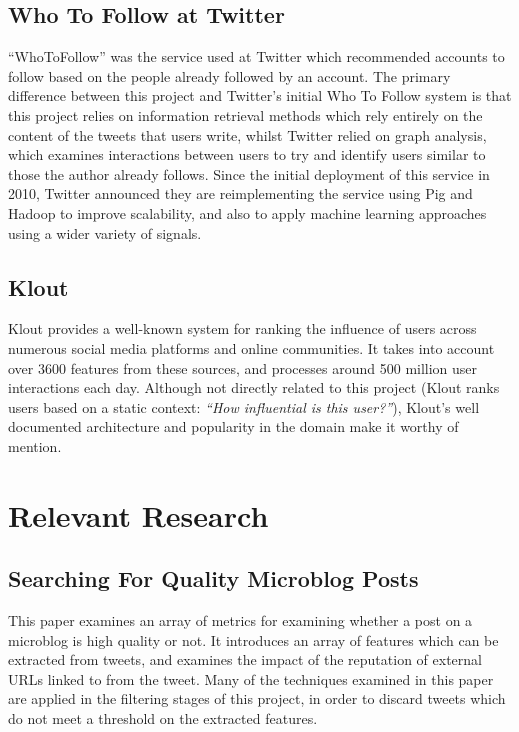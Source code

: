 \documentclass{l4proj}
\begin{document}
\subsection{Who To Follow at Twitter}
``WhoToFollow'' was the service used at Twitter which recommended accounts to follow based on the people already followed by an account. The primary difference between this project and Twitter's initial Who To Follow system is that this project relies on information retrieval methods which rely entirely on the content of the tweets that users write, whilst Twitter relied on graph analysis, which examines interactions between users to try and identify users similar to those the author already follows. Since the initial deployment of this service in 2010, Twitter announced they are reimplementing the service using Pig and Hadoop to improve scalability, and also to apply machine learning approaches using a wider variety of signals.

\subsection{Klout}
Klout provides a well-known system for ranking the influence of users across numerous social media platforms and online communities. It takes into account over 3600 features from these sources, and processes around 500 million user interactions each day. Although not directly related to this project (Klout ranks users based on a static context: \textit{``How influential is this user?''}), Klout's well documented architecture and popularity in the domain make it worthy of mention.

\section{Relevant Research}


    \subsection{Searching For Quality Microblog Posts}
    This paper examines an array of metrics for examining whether a post on a microblog is high quality or not. It introduces an array of features which can be extracted from tweets, and examines the impact of the reputation of external URLs linked to from the tweet. Many of the techniques examined in this paper are applied in the filtering stages of this project, in order to discard tweets which do not meet a threshold on the extracted features.
\end{document}
